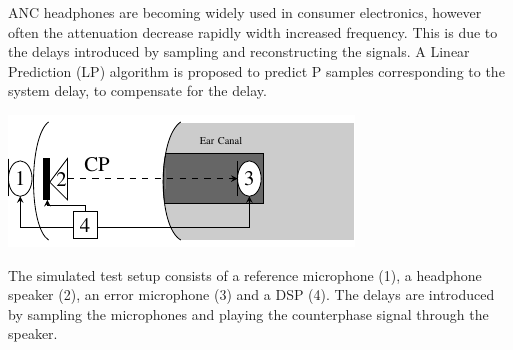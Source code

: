 \large
ANC headphones are becoming widely used in consumer electronics, however often the attenuation decrease rapidly width increased frequency. This is due to the delays introduced by sampling and reconstructing the signals.
A Linear Prediction (LP) algorithm is proposed to predict P samples corresponding to the system delay, to compensate for the delay.   
\begin{centering}
	\includegraphics[width=\textwidth]{figures/BasicOverviewZoomed.pdf}
\end{centering}
The simulated test setup consists of a reference microphone (1), a headphone speaker (2), an error microphone (3) and a DSP (4). The delays are introduced by sampling the microphones and playing the counterphase signal through the speaker.\\ 